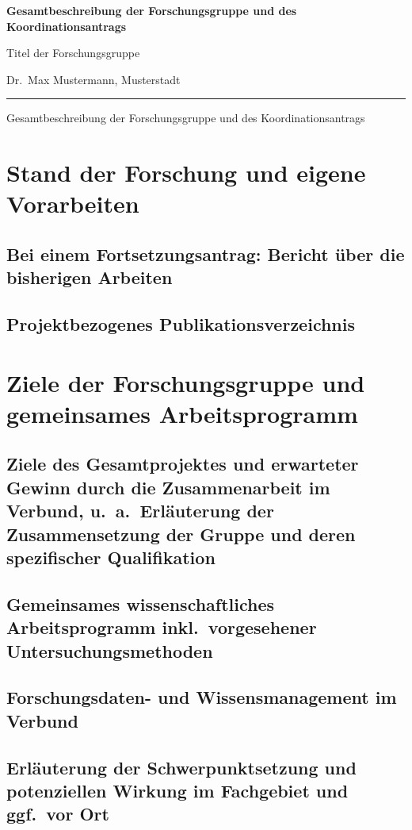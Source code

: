 \documentclass{scrartcl}
\newcommand{\spokesperson}{Dr.\ Max Mustermann, Musterstadt}
\newcommand{\project}{Titel der Forschungsgruppe}
\begin{document}
{\raggedright{} \normalsize \bfseries
	Gesamtbeschreibung der Forschungsgruppe und des Koordinationsantrags \par
    \project{} \par
    \spokesperson{} \par
	\rule{\textwidth}{0.5pt} \par
	Gesamtbeschreibung der Forschungsgruppe und des Koordinationsantrags
}

\section{Stand der Forschung und eigene Vorarbeiten}

\subsection{Bei einem Fortsetzungsantrag: Bericht über die bisherigen Arbeiten}

\subsection{Projektbezogenes Publikationsverzeichnis}
\printbibliography[heading=none]


\section{Ziele der Forschungsgruppe und gemeinsames Arbeitsprogramm}

\subsection{Ziele des Gesamtprojektes und erwarteter Gewinn durch die Zusammenarbeit im Verbund, u.\ a.\ Erläuterung der Zusammensetzung der Gruppe und deren spezifischer Qualifikation}

\subsection{Gemeinsames wissenschaftliches Arbeitsprogramm inkl.\ vorgesehener Untersuchungsmethoden}

\subsection{Forschungsdaten- und Wissensmanagement im Verbund}

\subsection{Erläuterung der Schwerpunktsetzung und potenziellen Wirkung im Fachgebiet und ggf.\ vor Ort}
\end{document}
